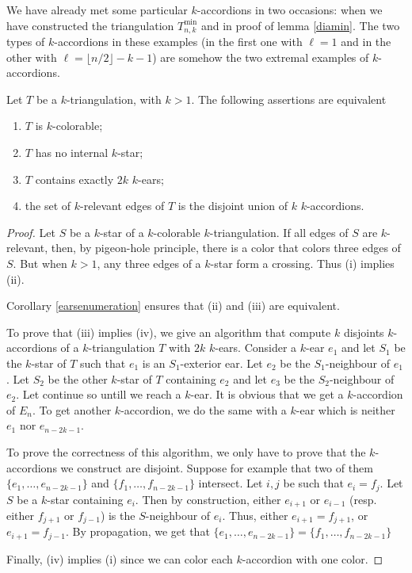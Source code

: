 \documentclass[12pt]{amsart}
\begin{document}
We have already met some particular $k$-accordions in two occasions: when we have constructed the triangulation $T_{n,k}^{\min}$ and in proof of lemma \ref{diamin}. The two types of $k$-accordions in these examples (in the first one with $\ell=1$ and in the other with $\ell=\lfloor n/2\rfloor-k-1$) are somehow the two extremal examples of $k$-accordions.

\begin{proposition}\label{colorable}
Let $T$ be a $k$-triangulation, with $k>1$. The following assertions are equivalent
\begin{enumerate}
\item $T$ is $k$-colorable;
\item $T$ has no internal $k$-star;
\item $T$ contains exactly $2k$ $k$-ears;
\item the set of $k$-relevant edges of $T$ is the disjoint union of $k$ $k$-accordions.
\end{enumerate}
\end{proposition}

\begin{proof}
Let $S$ be a $k$-star of a $k$-colorable $k$-triangulation. If all edges of $S$ are $k$-relevant, then, by pigeon-hole principle, there is a color that colors three edges of $S$. But when $k>1$, any three edges of a $k$-star form a crossing. Thus (i) implies (ii).

Corollary \ref{earsenumeration} ensures that (ii) and (iii) are equivalent.

To prove that (iii) implies (iv), we give an algorithm that compute $k$ disjoints $k$-accordions of a $k$-triangulation $T$ with $2k$ $k$-ears. Consider a $k$-ear $e_1$ and let $S_1$ be the $k$-star of $T$ such that $e_1$ is an $S_1$-exterior ear. Let $e_2$ be the $S_1$-neighbour of $e_1$. Let $S_2$ be the other $k$-star of $T$ containing $e_2$ and let $e_3$ be the $S_2$-neighbour of $e_2$. Let continue so untill we reach a $k$-ear. It is obvious that we get a $k$-accordion of $E_n$. To get another $k$-accordion, we do the same with a $k$-ear which is neither $e_1$ nor $e_{n-2k-1}$. 

To prove the correctness of this algorithm, we only have to prove that the $k$-accordions we construct are disjoint. Suppose for example that two of them $\{e_1,\ldots,e_{n-2k-1}\}$ and $\{f_1,\ldots,f_{n-2k-1}\}$ intersect. Let $i,j$ be such that $e_i=f_j$. Let $S$ be a $k$-star containing $e_i$. Then by construction, either $e_{i+1}$ or $e_{i-1}$ (resp. either $f_{j+1}$ or $f_{j-1}$) is the $S$-neighbour of $e_i$. Thus, either $e_{i+1}=f_{j+1}$, or $e_{i+1}=f_{j-1}$. By propagation, we get that $\{e_1,\ldots,e_{n-2k-1}\}=\{f_1,\ldots,f_{n-2k-1}\}$

Finally, (iv) implies (i) since we can color each $k$-accordion with one color.
\end{proof}
\end{document}
